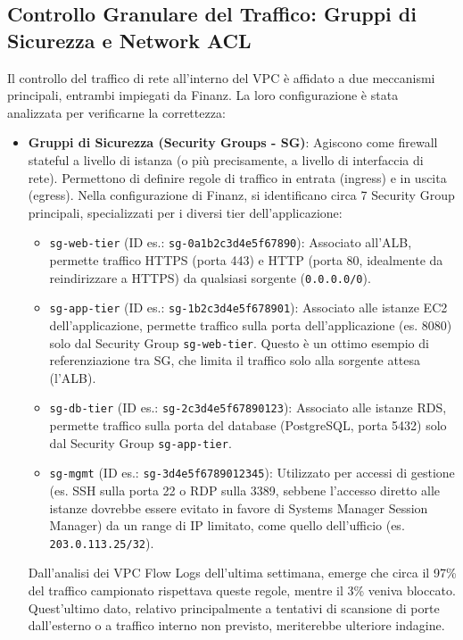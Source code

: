 \subsection{Controllo Granulare del Traffico: Gruppi di Sicurezza e Network ACL}
\label{subsec:sg-nacl_cap2}
Il controllo del traffico di rete all'interno del VPC è affidato a due meccanismi principali, entrambi impiegati da Finanz. La loro configurazione è stata analizzata per verificarne la correttezza:
\begin{itemize}
\item \textbf{Gruppi di Sicurezza (Security Groups - SG)}: Agiscono come firewall stateful a livello di istanza (o più precisamente, a livello di interfaccia di rete). Permettono di definire regole di traffico in entrata (ingress) e in uscita (egress). Nella configurazione di Finanz, si identificano circa 7 Security Group principali, specializzati per i diversi tier dell'applicazione:
\begin{itemize}
\item \texttt{sg-web-tier} (ID es.: \texttt{sg-0a1b2c3d4e5f67890}): Associato all'ALB, permette traffico HTTPS (porta 443) e HTTP (porta 80, idealmente da reindirizzare a HTTPS) da qualsiasi sorgente (\texttt{0.0.0.0/0}).
\item \texttt{sg-app-tier} (ID es.: \texttt{sg-1b2c3d4e5f678901}): Associato alle istanze EC2 dell'applicazione, permette traffico sulla porta dell'applicazione (es. 8080) solo dal Security Group \texttt{sg-web-tier}. Questo è un ottimo esempio di referenziazione tra SG, che limita il traffico solo alla sorgente attesa (l'ALB).
\item \texttt{sg-db-tier} (ID es.: \texttt{sg-2c3d4e5f67890123}): Associato alle istanze RDS, permette traffico sulla porta del database (PostgreSQL, porta 5432) solo dal Security Group \texttt{sg-app-tier}.
\item \texttt{sg-mgmt} (ID es.: \texttt{sg-3d4e5f6789012345}): Utilizzato per accessi di gestione (es. SSH sulla porta 22 o RDP sulla 3389, sebbene l'accesso diretto alle istanze dovrebbe essere evitato in favore di Systems Manager Session Manager) da un range di IP limitato, come quello dell'ufficio (es. \texttt{203.0.113.25/32}).
\end{itemize}
Dall'analisi dei VPC Flow Logs dell'ultima settimana, emerge che circa il 97\% del traffico campionato rispettava queste regole, mentre il 3\% veniva bloccato. Quest'ultimo dato, relativo principalmente a tentativi di scansione di porte dall'esterno o a traffico interno non previsto, meriterebbe ulteriore indagine.

\end{itemize}
